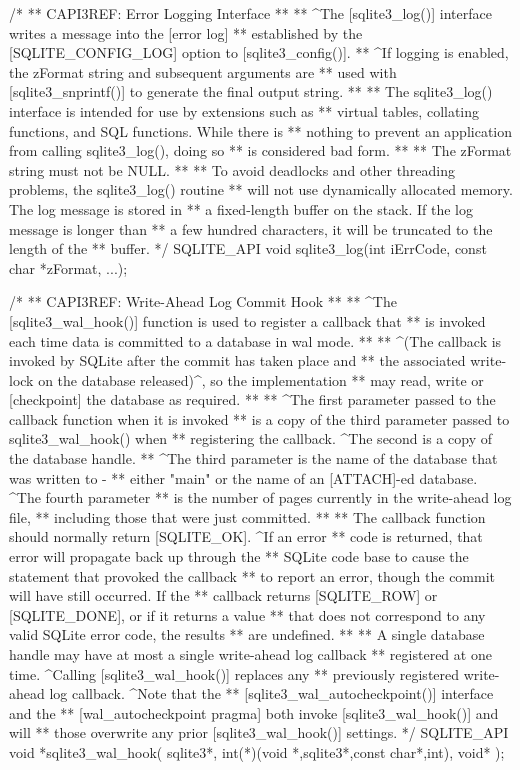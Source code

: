 \begin{Codex}[label=sqlite3.h,numbers=left]
{/*
** CAPI3REF: Error Logging Interface
**
** ^The [sqlite3_log()] interface writes a message into the [error log]
** established by the [SQLITE_CONFIG_LOG] option to [sqlite3_config()].
** ^If logging is enabled, the zFormat string and subsequent arguments are
** used with [sqlite3_snprintf()] to generate the final output string.
**
** The sqlite3_log() interface is intended for use by extensions such as
** virtual tables, collating functions, and SQL functions.  While there is
** nothing to prevent an application from calling sqlite3_log(), doing so
** is considered bad form.
**
** The zFormat string must not be NULL.
**
** To avoid deadlocks and other threading problems, the sqlite3_log() routine
** will not use dynamically allocated memory.  The log message is stored in
** a fixed-length buffer on the stack.  If the log message is longer than
** a few hundred characters, it will be truncated to the length of the
** buffer.
*/
SQLITE_API void sqlite3_log(int iErrCode, const char *zFormat, ...);

/*
** CAPI3REF: Write-Ahead Log Commit Hook
**
** ^The [sqlite3_wal_hook()] function is used to register a callback that
** is invoked each time data is committed to a database in wal mode.
**
** ^(The callback is invoked by SQLite after the commit has taken place and 
** the associated write-lock on the database released)^, so the implementation 
** may read, write or [checkpoint] the database as required.
**
** ^The first parameter passed to the callback function when it is invoked
** is a copy of the third parameter passed to sqlite3_wal_hook() when
** registering the callback. ^The second is a copy of the database handle.
** ^The third parameter is the name of the database that was written to -
** either "main" or the name of an [ATTACH]-ed database. ^The fourth parameter
** is the number of pages currently in the write-ahead log file,
** including those that were just committed.
**
** The callback function should normally return [SQLITE_OK].  ^If an error
** code is returned, that error will propagate back up through the
** SQLite code base to cause the statement that provoked the callback
** to report an error, though the commit will have still occurred. If the
** callback returns [SQLITE_ROW] or [SQLITE_DONE], or if it returns a value
** that does not correspond to any valid SQLite error code, the results
** are undefined.
**
** A single database handle may have at most a single write-ahead log callback 
** registered at one time. ^Calling [sqlite3_wal_hook()] replaces any
** previously registered write-ahead log callback. ^Note that the
** [sqlite3_wal_autocheckpoint()] interface and the
** [wal_autocheckpoint pragma] both invoke [sqlite3_wal_hook()] and will
** those overwrite any prior [sqlite3_wal_hook()] settings.
*/
SQLITE_API void *sqlite3_wal_hook(
  sqlite3*, 
  int(*)(void *,sqlite3*,const char*,int),
  void*
);

}
\end{Codex}

